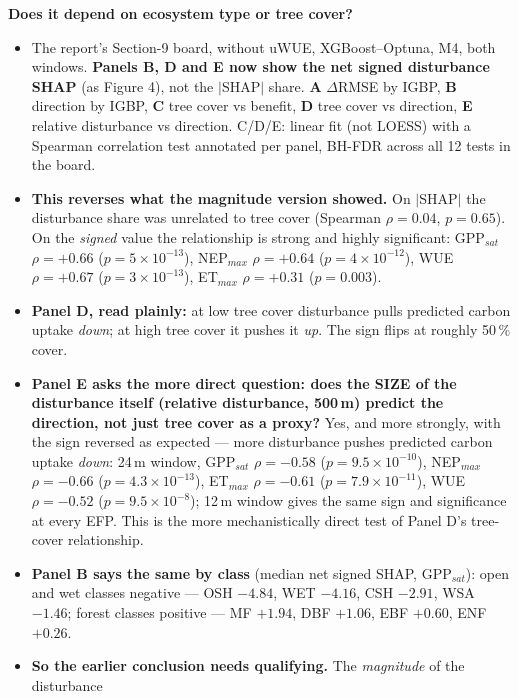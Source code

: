 \documentclass[11pt,a4paper]{article}
\begin{document}
\textbf{Does it depend on ecosystem type or tree cover?}
\begin{itemize}
  \item The report's Section-9 board, without uWUE, XGBoost--Optuna, M4, both windows.
        \textbf{Panels B, D and E now show the net signed disturbance SHAP} (as Figure 4), not the
        $|$SHAP$|$ share. \textbf{A} $\Delta$RMSE by IGBP, \textbf{B} direction by IGBP,
        \textbf{C} tree cover vs benefit, \textbf{D} tree cover vs direction,
        \textbf{E} relative disturbance vs direction. C/D/E: linear fit (not LOESS) with a
        Spearman correlation test annotated per panel, BH-FDR across all 12 tests in the board.
  \item \textbf{This reverses what the magnitude version showed.} On $|$SHAP$|$ the disturbance share
        was unrelated to tree cover (Spearman $\rho = 0.04$, $p = 0.65$). On the \emph{signed} value the
        relationship is strong and highly significant:
        GPP$_{sat}$ $\rho = +0.66$ ($p = 5\times10^{-13}$), NEP$_{max}$ $\rho = +0.64$
        ($p = 4\times10^{-12}$), WUE $\rho = +0.67$ ($p = 3\times10^{-13}$),
        ET$_{max}$ $\rho = +0.31$ ($p = 0.003$).
  \item \textbf{Panel D, read plainly:} at low tree cover disturbance pulls predicted carbon uptake
        \emph{down}; at high tree cover it pushes it \emph{up}. The sign flips at roughly 50\,\% cover.
  \item \textbf{Panel E asks the more direct question: does the SIZE of the disturbance itself
        (relative disturbance, 500\,m) predict the direction, not just tree cover as a proxy?}
        Yes, and more strongly, with the sign reversed as expected --- more disturbance pushes
        predicted carbon uptake \emph{down}: 24\,m window, GPP$_{sat}$ $\rho = -0.58$
        ($p = 9.5\times10^{-10}$), NEP$_{max}$ $\rho = -0.66$ ($p = 4.3\times10^{-13}$),
        ET$_{max}$ $\rho = -0.61$ ($p = 7.9\times10^{-11}$), WUE $\rho = -0.52$
        ($p = 9.5\times10^{-8}$); 12\,m window gives the same sign and significance at every EFP.
        This is the more mechanistically direct test of Panel D's tree-cover relationship.
  \item \textbf{Panel B says the same by class} (median net signed SHAP, GPP$_{sat}$):
        open and wet classes negative --- OSH $-4.84$, WET $-4.16$, CSH $-2.91$, WSA $-1.46$;
        forest classes positive --- MF $+1.94$, DBF $+1.06$, EBF $+0.60$, ENF $+0.26$.
  \item \textbf{So the earlier conclusion needs qualifying.} The \emph{magnitude} of the disturbance

\end{itemize}
\end{document}
